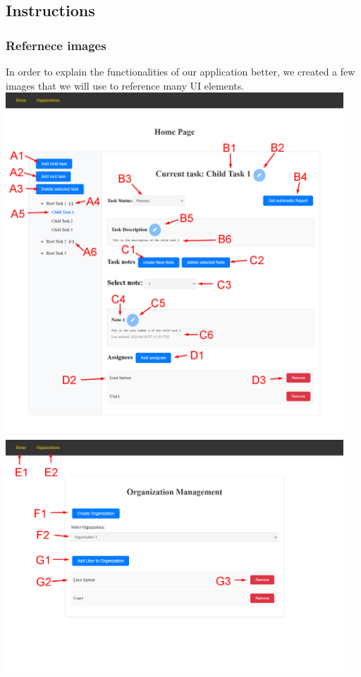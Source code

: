 \documentclass{article}
\begin{document}
\subsection{Instructions}

\subsubsection{Refernece images}
In order to explain the functionalities of our application better, we created a few images that we will use to reference many UI elements.
\newline
\newline
\newline
\includegraphics[width=0.95\textwidth]{images/home_page.jpg}
\newline
\includegraphics[width=0.95\textwidth]{images/organizations_page.jpg}
\end{document}
